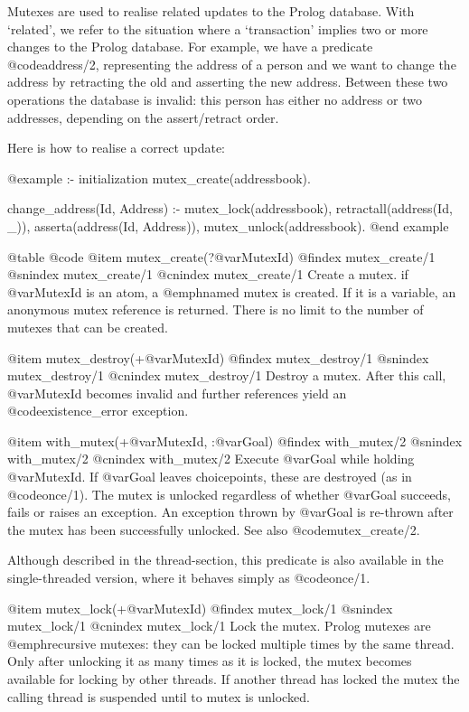 Mutexes are used to realise related updates to the Prolog database.
With `related', we refer to the situation where a `transaction' implies
two or more changes to the Prolog database.  For example, we have a
predicate @code{address/2}, representing the address of a person and we want
to change the address by retracting the old and asserting the new
address.  Between these two operations the database is invalid: this
person has either no address or two addresses, depending on the
assert/retract order.

Here is how to realise a correct update:

@example
:- initialization
    mutex_create(addressbook).

change_address(Id, Address) :-
    mutex_lock(addressbook),
    retractall(address(Id, _)),
    asserta(address(Id, Address)),
    mutex_unlock(addressbook).
@end example


@table @code
@item mutex_create(?@var{MutexId})
@findex mutex_create/1
@snindex mutex_create/1
@cnindex mutex_create/1
Create a mutex.  if @var{MutexId} is an atom, a @emph{named} mutex is
created.  If it is a variable, an anonymous mutex reference is returned.
There is no limit to the number of mutexes that can be created.

@item mutex_destroy(+@var{MutexId})
@findex mutex_destroy/1
@snindex mutex_destroy/1
@cnindex mutex_destroy/1
Destroy a mutex.  After this call, @var{MutexId} becomes invalid and
further references yield an @code{existence_error} exception.

@item with_mutex(+@var{MutexId}, :@var{Goal})
@findex with_mutex/2
@snindex with_mutex/2
@cnindex with_mutex/2
Execute @var{Goal} while holding @var{MutexId}.  If @var{Goal} leaves
choicepoints, these are destroyed (as in @code{once/1}).  The mutex is unlocked
regardless of whether @var{Goal} succeeds, fails or raises an exception.
An exception thrown by @var{Goal} is re-thrown after the mutex has been
successfully unlocked.  See also @code{mutex_create/2}.

Although described in the thread-section, this predicate is also
available in the single-threaded version, where it behaves simply as
@code{once/1}.

@item mutex_lock(+@var{MutexId})
@findex mutex_lock/1
@snindex mutex_lock/1
@cnindex mutex_lock/1
Lock the mutex.  Prolog mutexes are @emph{recursive} mutexes: they
can be locked multiple times by the same thread.  Only after unlocking
it as many times as it is locked, the mutex becomes available for
locking by other threads. If another thread has locked the mutex the
calling thread is suspended until to mutex is unlocked.

